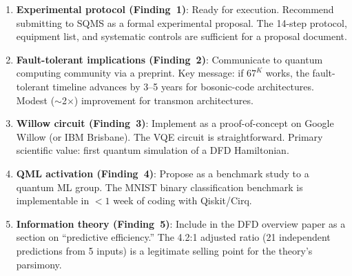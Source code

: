 \documentclass[11pt]{article}
\theoremstyle{definition}
\theoremstyle{remark}
\begin{document}
\begin{enumerate}
\item \textbf{Experimental protocol (Finding~1)}: Ready for execution.
  Recommend submitting to SQMS as a formal experimental proposal.
  The 14-step protocol, equipment list, and systematic controls are
  sufficient for a proposal document.

\item \textbf{Fault-tolerant implications (Finding~2)}: Communicate to
  quantum computing community via a preprint. Key message: if $67^K$
  works, the fault-tolerant timeline advances by 3--5 years for
  bosonic-code architectures. Modest ($\sim$2$\times$) improvement for
  transmon architectures.

\item \textbf{Willow circuit (Finding~3)}: Implement as a
  proof-of-concept on Google Willow (or IBM Brisbane). The VQE circuit
  is straightforward. Primary scientific value: first quantum simulation
  of a DFD Hamiltonian.

\item \textbf{QML activation (Finding~4)}: Propose as a benchmark study
  to a quantum ML group. The MNIST binary classification benchmark is
  implementable in $< 1$ week of coding with Qiskit/Cirq.

\item \textbf{Information theory (Finding~5)}: Include in the DFD
  overview paper as a section on ``predictive efficiency.'' The 4.2:1
  adjusted ratio (21 independent predictions from 5 inputs) is a
  legitimate selling point for the theory's parsimony.
\end{enumerate}
\end{document}
